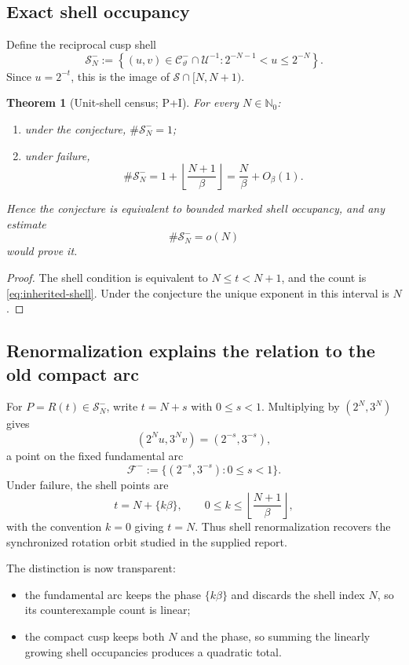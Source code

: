 \documentclass[10pt,oneside]{article}
\newtheorem{theorem}{Theorem}[section]
\theoremstyle{definition}
\theoremstyle{remark}
\newcommand{\Nzero}{\mathbb N_0}
\newcommand{\Sol}{\mathcal S}
\newcommand{\thetaq}{\vartheta}
\newcommand{\rec}{\mathcal C^-_{\thetaq}}
\newcommand{\unitrec}{\mathcal U^{-1}}
\newcommand{\statusP}{\textsc{P}}
\newcommand{\statusI}{\textsc{I}}
\begin{document}
\subsection{Exact shell occupancy}
Define the reciprocal cusp shell
\[
 \mathscr S_N^-:=
 \left\{(u,v)\in\rec\cap\unitrec:
 2^{-N-1}<u\le2^{-N}\right\}.
\]
Since \(u=2^{-t}\), this is the image of \(\Sol\cap[N,N+1)\).

\begin{theorem}[Unit-shell census; \statusP+\statusI]
\label{thm:shell-census}
For every \(N\in\Nzero\):
\begin{enumerate}[label=\textup{(\roman*)}]
\item under the conjecture, \(\#\mathscr S_N^-=1\);
\item under failure,
\[
 \#\mathscr S_N^-
 =1+\left\lfloor\frac{N+1}{\beta}\right\rfloor
 =\frac{N}{\beta}+O_\beta(1).
\]
\end{enumerate}
Hence the conjecture is equivalent to bounded marked shell occupancy, and any estimate
\[
 \#\mathscr S_N^-=o(N)
\]
would prove it.
\end{theorem}

\begin{proof}
The shell condition is equivalent to \(N\le t<N+1\), and the count is \eqref{eq:inherited-shell}.  Under the conjecture the unique exponent in this interval is \(N\).
\end{proof}

\subsection{Renormalization explains the relation to the old compact arc}
For \(P=R(t)\in\mathscr S_N^-\), write \(t=N+s\) with \(0\le s<1\).  Multiplying by \((2^N,3^N)\) gives
\[
 (2^Nu,3^Nv)=(2^{-s},3^{-s}),
\]
a point on the fixed fundamental arc
\[
 \mathcal F^-:=\{(2^{-s},3^{-s}):0\le s<1\}.
\]
Under failure, the shell points are
\[
 t=N+\{k\beta\},
 \qquad
 0\le k\le\left\lfloor\frac{N+1}{\beta}\right\rfloor,
\]
with the convention \(k=0\) giving \(t=N\).  Thus shell renormalization recovers the synchronized rotation orbit studied in the supplied report.

The distinction is now transparent:
\begin{itemize}
\item the fundamental arc keeps the phase \(\{k\beta\}\) and discards the shell index \(N\), so its counterexample count is linear;
\item the compact cusp keeps both \(N\) and the phase, so summing the linearly growing shell occupancies produces a quadratic total.
\end{itemize}
\end{document}
